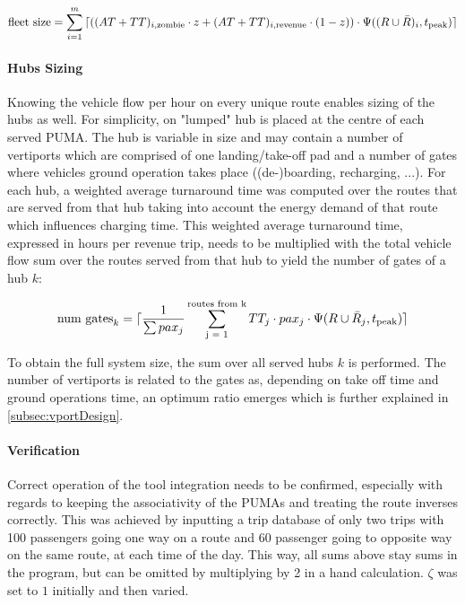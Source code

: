 \begin{align} \label{eq:fleetsize}
    \text{fleet size} = \sum_{i=1}^m { \lceil \left( (AT + TT)_{i, \text{zombie}} \cdot z + (AT + TT)_{i, \text{revenue}} \cdot (1-z) \right) \cdot \Psi((R\cup\bar{R})_i, t_{\text{peak}}) \rceil }
\end{align}


\paragraph{Hubs Sizing}

Knowing the vehicle flow per hour on every unique route enables sizing of the hubs as well. For simplicity, on "lumped" hub is placed at the centre of each served PUMA. The hub is variable in size and may contain a number of vertiports which are comprised of one landing/take-off pad and a number of gates where vehicles ground operation takes place ((de-)boarding, recharging, ...). For each hub, a weighted average turnaround time was computed over the routes that are served from that hub taking into account the energy demand of that route which influences charging time. This weighted average turnaround time, expressed in hours per revenue trip, needs to be multiplied with the total vehicle flow sum over the routes served from that hub to yield the number of gates of a hub $k$:

\begin{align}
    \text{num gates}_k = \lceil \frac{1}{\sum{pax_j}} \sum_{\text{j = 1}}^{\text{routes from k}} {TT_j \cdot pax_j \cdot \Psi(R\cup\bar{R}_j, t_{\text{peak}})} \rceil
\end{align}

To obtain the full system size, the sum over all served hubs $k$ is performed. The number of vertiports is related to the gates as, depending on take off time and ground operations time, an optimum ratio emerges which is further explained in \autoref{subsec:vportDesign}.



\paragraph{Verification}

Correct operation of the tool integration needs to be confirmed, especially with regards to keeping the associativity of the PUMAs and treating the route inverses correctly. This was achieved by inputting a trip database of only two trips with 100 passengers going one way on a route and 60 passenger going to opposite way on the same route, at each time of the day. This way, all sums above stay sums in the program, but can be omitted by multiplying by 2 in a hand calculation. $\zeta$ was set to $1$ initially and then varied.

